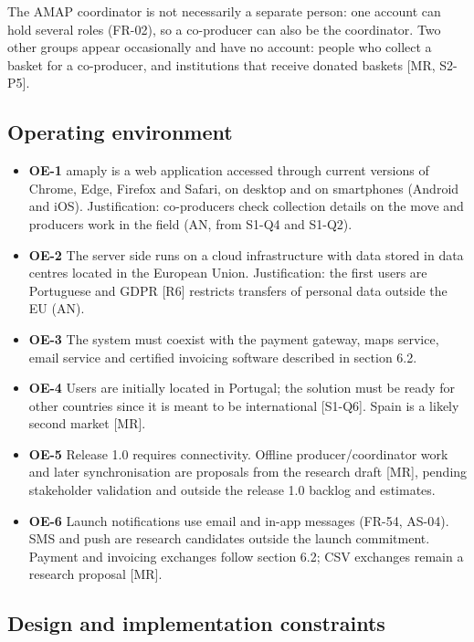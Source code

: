 \documentclass[11pt,a4paper]{article}
\begin{document}
The AMAP coordinator is not necessarily a separate person: one account can hold several roles (FR-02), so a co-producer can also be the coordinator. Two other groups appear occasionally and have no account: people who collect a basket for a co-producer, and institutions that receive donated baskets [MR, S2-P5].


\subsection{Operating environment}

\begin{itemize}
  \item \textbf{OE-1} amaply is a web application accessed through current versions of Chrome, Edge, Firefox and Safari, on desktop and on smartphones (Android and iOS). Justification: co-producers check collection details on the move and producers work in the field (AN, from S1-Q4 and S1-Q2).
  \item \textbf{OE-2} The server side runs on a cloud infrastructure with data stored in data centres located in the European Union. Justification: the first users are Portuguese and GDPR [R6] restricts transfers of personal data outside the EU (AN).
  \item \textbf{OE-3} The system must coexist with the payment gateway, maps service, email service and certified invoicing software described in section 6.2.
  \item \textbf{OE-4} Users are initially located in Portugal; the solution must be ready for other countries since it is meant to be international [S1-Q6]. Spain is a likely second market [MR].
  \item \textbf{OE-5} Release 1.0 requires connectivity. Offline producer/coordinator work and later synchronisation are proposals from the research draft [MR], pending stakeholder validation and outside the release 1.0 backlog and estimates.
  \item \textbf{OE-6} Launch notifications use email and in-app messages (FR-54, AS-04). SMS and push are research candidates outside the launch commitment. Payment and invoicing exchanges follow section 6.2; CSV exchanges remain a research proposal [MR].
\end{itemize}

\subsection{Design and implementation constraints}
\end{document}
